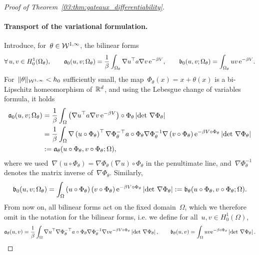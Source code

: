\begin{proof}[Proof of Theorem~\ref{03:thm:gateaux_differentiability}]
    \paragraph{Transport of the variational formulation.}
    Introduce, for~$\theta\in{\mathcal{W}}^{1,\infty}$, the bilinear forms
    \begin{equation}
        \label{03:eq:bilinear_forms_0}
        \forall\,u,v\in H_0^1(\Omega_\theta),\qquad \mathfrak{a}_0(u,v;\Omega_\theta) = \frac1\beta\int_{\Omega_\theta}\nabla u^\top a \nabla v \,\mathrm{e}^{-\beta V},\qquad \mathfrak{b}_0(u,v;\Omega_\theta) = \int_{\Omega_\theta}uv\,\mathrm{e}^{-\beta V}.
    \end{equation}
    For~$\|\theta\|_{{\mathcal{W}}^{1,\infty}}<h_0$ sufficiently small, the map~$\Phi_\theta(x) = x + \theta(x)$ is a bi-Lipschitz homeomorphism of~$\mathbb{R}^d$, and using the Lebesgue change of variables formula, it holds
    \begin{equation}
        \begin{aligned}
        \mathfrak{a}_0(u,v;\Omega_\theta) &= \frac1\beta \int_{\Omega}\left(\nabla u^\top a \nabla v\,\mathrm{e}^{-\beta V}\right)\circ \Phi_\theta \left|\det\,\nabla \Phi_\theta\right|\\
        &=\frac1\beta\int_\Omega \nabla\left(u\circ \Phi_\theta\right)^\top \nabla \Phi_\theta^{-\top}a\circ \Phi_\theta \nabla \Phi_\theta^{-1}\nabla\left(v\circ\Phi_\theta\right)\mathrm{e}^{-\beta V\circ\Phi_\theta}\left|\det\,\nabla\Phi_\theta\right|\\
        &:=\mathfrak{a}_\theta(u\circ \Phi_\theta,v\circ\Phi_\theta;\Omega),
        \end{aligned}
    \end{equation}
    where we used~$\nabla\left(u\circ\Phi_\theta\right)=\nabla \Phi_\theta \left(\nabla u\right)\circ\Phi_\theta$ in the penultimate line, and~$\nabla \Phi_\theta^{-1}$ denotes the matrix inverse of~$\nabla \Phi_\theta$.
    Similarly,
    \begin{equation}
        \mathfrak{b}_0(u,v;\Omega_\theta) = \int_\Omega \left(u\circ\Phi_\theta\right) \left(v\circ\Phi_\theta\right) \mathrm{e}^{-\beta V\circ \Phi_\theta}\left|\det\,\nabla \Phi_\theta\right| := \mathfrak{b}_\theta(u\circ\Phi_\theta,v\circ\Phi_\theta;\Omega).
    \end{equation}
    From now on, all bilinear forms act on the fixed domain~$\Omega$, which we therefore omit in the notation for the bilinear forms, i.e. we define for all~$u,v\in H_0^1(\Omega)$,
    \begin{equation}
        \label{03:eq:bilinear_forms}
        \mathfrak{a}_\theta(u,v) = \frac1\beta\int_\Omega \nabla u^\top \nabla \Phi_\theta^{-\top}a\circ \Phi_\theta \nabla \Phi_\theta^{-1}\nabla v\mathrm{e}^{-\beta V\circ\Phi_\theta}\left|\det\,\nabla\Phi_\theta\right|,\qquad \mathfrak{b}_\theta(u,v) = \int_\Omega uv\mathrm{e}^{-\beta \circ \Phi_\theta}\left|\det\,\nabla\Phi_\theta\right|.
    \end{equation}


\end{proof}
